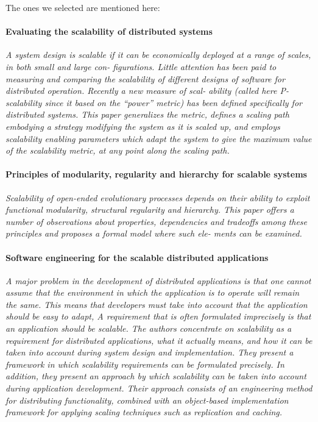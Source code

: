 \documentclass{article}
\begin{document}
{The ones we selected are mentioned here:

\paragraph{Evaluating the scalability of distributed systems}
\cite{jogalekar2000evaluating}

\emph{A system design is scalable if it can be economically deployed at a range
of scales, in both small and large con- figurations. Little attention has been
paid to measuring and comparing the scalability of different designs of
software for distributed operation. Recently a new measure of scal- ability
(called here P-scalability since it based on the “power” metric) has been
defined specifically for distributed systems. This paper generalizes the
metric, defines a scaling path embodying a strategy modifying the system as it
is scaled up, and employs scalability enabling parameters which adapt the
system to give the maximum value of the scalability metric, at any point along
the scaling path.}

\paragraph{Principles of modularity, regularity and hierarchy for scalable
systems} \cite{lipson2007principles}

\emph{Scalability of open-ended evolutionary processes depends on their ability
to exploit functional modularity, structural regularity and hierarchy.  This
paper offers a number of observations about properties, dependencies and
tradeoffs among these principles and proposes a formal model where such ele-
ments can be examined.}

\paragraph{Software engineering for the scalable distributed applications}
\cite{van1998software}

\emph{A major problem in the development of distributed applications is that
one cannot assume that the environment in which the application is to operate
will remain the same. This means that developers must take into account that
the application should be easy to adapt, A requirement that is often formulated
imprecisely is that an application should be scalable. The authors concentrate
on scalability as a requirement for distributed applications, what it actually
means, and how it can be taken into account during system design and
implementation. They present a framework in which scalability requirements can
be formulated precisely. In addition, they present an approach by which
scalability can be taken into account during application development. Their
approach consists of an engineering method for distributing functionality,
combined with an object-based implementation framework for applying scaling
techniques such as replication and caching.}

}
\end{document}
